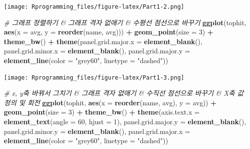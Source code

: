 \documentclass[10pt,]{krantz}
\makeatletter
\newenvironment{Shaded}{\begin{snugshade}}{\end{snugshade}}
\newcommand{\KeywordTok}[1]{\textcolor[rgb]{0.13,0.29,0.53}{\textbf{#1}}}
\newcommand{\DataTypeTok}[1]{\textcolor[rgb]{0.13,0.29,0.53}{#1}}
\newcommand{\DecValTok}[1]{\textcolor[rgb]{0.00,0.00,0.81}{#1}}
\newcommand{\StringTok}[1]{\textcolor[rgb]{0.31,0.60,0.02}{#1}}
\newcommand{\CommentTok}[1]{\textcolor[rgb]{0.56,0.35,0.01}{\textit{#1}}}
\newcommand{\OperatorTok}[1]{\textcolor[rgb]{0.81,0.36,0.00}{\textbf{#1}}}
\newcommand{\NormalTok}[1]{#1}
\newenvironment{kframe}{%
\medskip{}
\setlength{\fboxsep}{.8em}
 \def\at@end@of@kframe{}%
 \ifinner\ifhmode%
  \def\at@end@of@kframe{\end{minipage}}%
  \begin{minipage}{\columnwidth}%
 \fi\fi%
 \def\FrameCommand##1{\hskip\@totalleftmargin \hskip-\fboxsep
 \colorbox{shadecolor}{##1}\hskip-\fboxsep
     \hskip-\linewidth \hskip-\@totalleftmargin \hskip\columnwidth}%
 \MakeFramed {\advance\hsize-\width
   \@totalleftmargin\z@ \linewidth\hsize
   \@setminipage}}%
 {\par\unskip\endMakeFramed%
 \at@end@of@kframe}
\renewenvironment{Shaded}{\begin{kframe}}{\end{kframe}}
\theoremstyle{definition}
\theoremstyle{definition}
\theoremstyle{remark}
\makeatother
\begin{document}
\texttt{[image: Rprogramming\_files/figure-latex/Part1-2.png]}

\begin{Shaded}
\begin{Highlighting}[]


\CommentTok{# 그래프 정렬하기 & 그래프 격자 없애기 & 수평선 점선으로 바꾸기}
\KeywordTok{ggplot}\NormalTok{(tophit, }\KeywordTok{aes}\NormalTok{(}\DataTypeTok{x =}\NormalTok{ avg, }\DataTypeTok{y =} \KeywordTok{reorder}\NormalTok{(name, avg))) }\OperatorTok{+}\StringTok{ }\KeywordTok{geom_point}\NormalTok{(}\DataTypeTok{size =} \DecValTok{3}\NormalTok{) }\OperatorTok{+}\StringTok{ }\KeywordTok{theme_bw}\NormalTok{() }\OperatorTok{+}\StringTok{ }
\StringTok{  }\KeywordTok{theme}\NormalTok{(}\DataTypeTok{panel.grid.major.x =} \KeywordTok{element_blank}\NormalTok{(),}
        \DataTypeTok{panel.grid.minor.x =} \KeywordTok{element_blank}\NormalTok{(),}
        \DataTypeTok{panel.grid.major.y =} \KeywordTok{element_line}\NormalTok{(}\DataTypeTok{color =} \StringTok{"grey60"}\NormalTok{, }\DataTypeTok{linetype =} \StringTok{"dashed"}\NormalTok{))}
\end{Highlighting}
\end{Shaded}

\texttt{[image: Rprogramming\_files/figure-latex/Part1-3.png]}

\begin{Shaded}
\begin{Highlighting}[]
\CommentTok{# x, y축 바꿔서 그치기 & 그래프 격자 없애기 & 수직선 점선으로 바꾸기 & X축 값 정의 및 회전}
\KeywordTok{ggplot}\NormalTok{(tophit, }\KeywordTok{aes}\NormalTok{(}\DataTypeTok{x =} \KeywordTok{reorder}\NormalTok{(name, avg), }\DataTypeTok{y =}\NormalTok{ avg)) }\OperatorTok{+}\StringTok{ }\KeywordTok{geom_point}\NormalTok{(}\DataTypeTok{size =} \DecValTok{3}\NormalTok{) }\OperatorTok{+}\StringTok{ }\KeywordTok{theme_bw}\NormalTok{() }\OperatorTok{+}\StringTok{ }
\StringTok{  }\KeywordTok{theme}\NormalTok{(}\DataTypeTok{axis.text.x =} \KeywordTok{element_text}\NormalTok{(}\DataTypeTok{angle =} \DecValTok{60}\NormalTok{, }\DataTypeTok{hjust =} \DecValTok{1}\NormalTok{),}
        \DataTypeTok{panel.grid.major.y =} \KeywordTok{element_blank}\NormalTok{(),}
        \DataTypeTok{panel.grid.minor.y =} \KeywordTok{element_blank}\NormalTok{(),}
        \DataTypeTok{panel.grid.major.x =} \KeywordTok{element_line}\NormalTok{(}\DataTypeTok{color =} \StringTok{"grey60"}\NormalTok{, }\DataTypeTok{linetype =} \StringTok{"dashed"}\NormalTok{))}
\end{Highlighting}
\end{Shaded}
\end{document}

